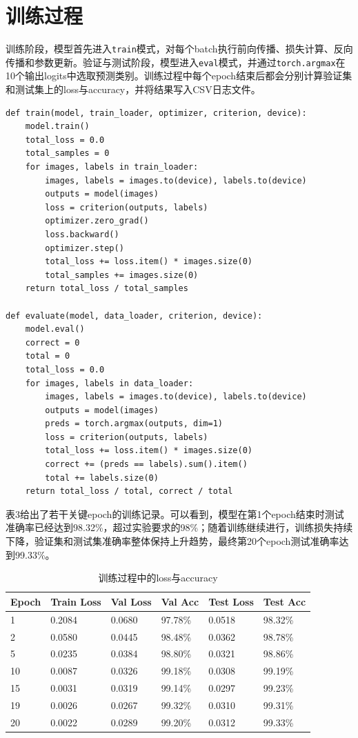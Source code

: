 \documentclass[11pt]{article}
\begin{document}
	\section{训练过程}
	训练阶段，模型首先进入\texttt{train}模式，对每个batch执行前向传播、损失计算、反向传播和参数更新。验证与测试阶段，模型进入\texttt{eval}模式，并通过\texttt{torch.argmax}在10个输出logits中选取预测类别。训练过程中每个epoch结束后都会分别计算验证集和测试集上的loss与accuracy，并将结果写入CSV日志文件。

	\begin{lstlisting}
def train(model, train_loader, optimizer, criterion, device):
    model.train()
    total_loss = 0.0
    total_samples = 0
    for images, labels in train_loader:
        images, labels = images.to(device), labels.to(device)
        outputs = model(images)
        loss = criterion(outputs, labels)
        optimizer.zero_grad()
        loss.backward()
        optimizer.step()
        total_loss += loss.item() * images.size(0)
        total_samples += images.size(0)
    return total_loss / total_samples

def evaluate(model, data_loader, criterion, device):
    model.eval()
    correct = 0
    total = 0
    total_loss = 0.0
    for images, labels in data_loader:
        images, labels = images.to(device), labels.to(device)
        outputs = model(images)
        preds = torch.argmax(outputs, dim=1)
        loss = criterion(outputs, labels)
        total_loss += loss.item() * images.size(0)
        correct += (preds == labels).sum().item()
        total += labels.size(0)
    return total_loss / total, correct / total
	\end{lstlisting}

	表3给出了若干关键epoch的训练记录。可以看到，模型在第1个epoch结束时测试准确率已经达到98.32\%，超过实验要求的98\%；随着训练继续进行，训练损失持续下降，验证集和测试集准确率整体保持上升趋势，最终第20个epoch测试准确率达到99.33\%。

	\begin{table}[H]
		\centering
		\caption{训练过程中的loss与accuracy}
		\begin{tabular}{M{1.4cm} M{2.2cm} M{2.2cm} M{2.2cm} M{2.2cm} M{2.2cm}}
			\toprule
			Epoch & Train Loss & Val Loss & Val Acc & Test Loss & Test Acc \\
			  & 0.2084 & 0.0680 & 97.78\% & 0.0518 & 98.32\% \\
			2  & 0.0580 & 0.0445 & 98.48\% & 0.0362 & 98.78\% \\
			5  & 0.0235 & 0.0384 & 98.80\% & 0.0321 & 98.86\% \\
			10 & 0.0087 & 0.0326 & 99.18\% & 0.0308 & 99.19\% \\
			15 & 0.0031 & 0.0319 & 99.14\% & 0.0297 & 99.23\% \\
			19 & 0.0026 & 0.0267 & 99.32\% & 0.0310 & 99.31\% \\
			20 & 0.0022 & 0.0289 & 99.20\% & 0.0312 & 99.33\% \\
			\bottomrule
		\end{tabular}
	\end{table}
\end{document}

